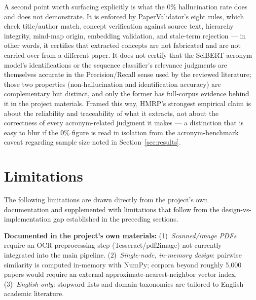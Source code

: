 \documentclass[10pt,conference]{IEEEtran}
\begin{document}
A second point worth surfacing explicitly is what the 0\% hallucination rate does and does not demonstrate. It is enforced by PaperValidator's eight rules, which check title/author match, concept verification against source text, hierarchy integrity, mind-map origin, embedding validation, and stale-term rejection --- in other words, it certifies that extracted concepts are not fabricated and are not carried over from a different paper. It does not certify that the SciBERT acronym model's identifications or the sequence classifier's relevance judgments are themselves accurate in the Precision/Recall sense used by the reviewed literature; those two properties (non-hallucination and identification accuracy) are complementary but distinct, and only the former has full-corpus evidence behind it in the project materials. Framed this way, HMRP's strongest empirical claim is about the reliability and traceability of what it extracts, not about the correctness of every acronym-related judgment it makes --- a distinction that is easy to blur if the 0\% figure is read in isolation from the acronym-benchmark caveat regarding sample size noted in Section~\ref{sec:results}.

\section{Limitations}
\label{sec:limitations}
The following limitations are drawn directly from the project's own documentation and supplemented with limitations that follow from the design-vs-implementation gap established in the preceding sections.

\textbf{Documented in the project's own materials:} (1)~\emph{Scanned/image PDFs} require an OCR preprocessing step (Tesseract/pdf2image) not currently integrated into the main pipeline. (2)~\emph{Single-node, in-memory design}: pairwise similarity is computed in-memory with NumPy; corpora beyond roughly 5{,}000 papers would require an external approximate-nearest-neighbor vector index. (3)~\emph{English-only}: stopword lists and domain taxonomies are tailored to English academic literature.
\end{document}
